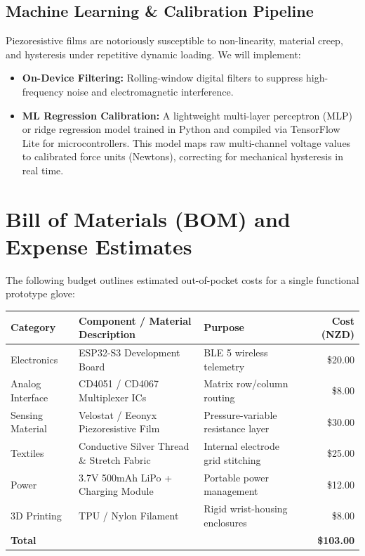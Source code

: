 \documentclass[11pt,a4paper]{article}
\begin{document}
\subsection{Machine Learning & Calibration Pipeline}
Piezoresistive films are notoriously susceptible to non-linearity, material creep, and hysteresis under repetitive dynamic loading. We will implement:
\begin{itemize}
    \item \textbf{On-Device Filtering:} Rolling-window digital filters to suppress high-frequency noise and electromagnetic interference.
    \item \textbf{ML Regression Calibration:} A lightweight multi-layer perceptron (MLP) or ridge regression model trained in Python and compiled via TensorFlow Lite for microcontrollers. This model maps raw multi-channel voltage values to calibrated force units (Newtons), correcting for mechanical hysteresis in real time.
\end{itemize}

\section{Bill of Materials (BOM) and Expense Estimates}
The following budget outlines estimated out-of-pocket costs for a single functional prototype glove:

\begin{table}[h]
\centering
\begin{tabular}{lllr}
\toprule
\textbf{Category} & \textbf{Component / Material Description} & \textbf{Purpose} & \textbf{Cost (NZD)} \\
\midrule
Electronics & ESP32-S3 Development Board & BLE 5 wireless telemetry & \$20.00 \\
Analog Interface & CD4051 / CD4067 Multiplexer ICs & Matrix row/column routing & \$8.00 \\
Sensing Material & Velostat / Eeonyx Piezoresistive Film & Pressure-variable resistance layer & \$30.00 \\
Textiles & Conductive Silver Thread \& Stretch Fabric & Internal electrode grid stitching & \$25.00 \\
Power & 3.7V 500mAh LiPo + Charging Module & Portable power management & \$12.00 \\
3D Printing & TPU / Nylon Filament & Rigid wrist-housing enclosures & \$8.00 \\
\midrule
\textbf{Total} & & & \textbf{\$103.00} \\
\bottomrule
\end{tabular}
\end{table}
\end{document}

